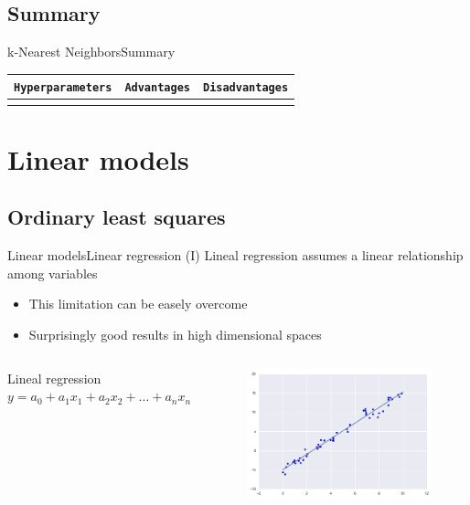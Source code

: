 \documentclass[10pt,compress]{beamer} %
\begin{document}
\subsection{Summary}
\begin{frame}{k-Nearest Neighbors}{Summary}
	\begin{center}
	\begin{tabular}{cp{3cm}p{3cm}}\hline
	 	\texttt{Hyperparameters}  & \texttt{Advantages}  & \texttt{Disadvantages} \\\hline
	 	                          &                               &   \\
	 	\hline
	\end{tabular}
	\end{center}
\end{frame}

\section{Linear models}
\subsection{Ordinary least squares}
\begin{frame}{Linear models}{Linear regression (I)}
     Lineal regression assumes a linear relationship among variables
	\begin{itemize}
		\item This limitation can be easely overcome
		\item Surprisingly good results in high dimensional spaces
	\end{itemize}

    \begin{columns}
        \begin{block}{Lineal regression}
            $y = a_0 + a_1 x_1  + a_2 x_2 + \dots + a_n x_n$
        \end{block}

		\begin{figure}
	        \includegraphics[width=\textwidth]{figs/regression.png}
		\end{figure}
    \end{columns}

\end{frame}
\end{document}
